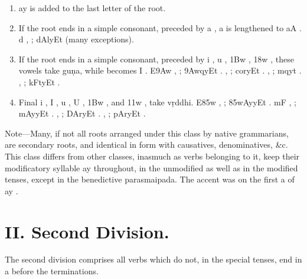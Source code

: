 \begin{enumerate}
  \begin{enumerate}
  \item {\dn ay}  is added to the last letter of the root.
  \item If the root ends in a simple consonant, preceded by {\dn a} ,
    {\dn a}  is lengthened to {\dn aA} . {\dn d} , ; {\dn dAlyEt}  (many exceptions).
  \item If the root ends in a simple consonant, preceded by {\dn i} ,
    {\dn u} , {\dn \31Bw} , {\dn \318w} , these vowels take guṇa, while
     becomes {\dn I} . {\dn E\39Aw} , ; {\dn \39Aw\?qyEt} . {\dn {}} , ; {\dn coryEt} . {\dn {}} , ; {\dn mq\0yt\?} . {\dn {}} ,
    ; {\dn kFt\0yEt} .
  \item Final {\dn i} , {\dn I} , {\dn u} , {\dn U} , {\dn \31Bw}
    , and {\dn \311w} , take vṛddhi. {\dn E\385w} ,
    ; {\dn \385wAyyEt} . {\dn mF} ,
    ; {\dn mAyyEt} . {\dn {}} , ; {\dn DAryEt} . {\dn {}} ,
    ; {\dn pAryEt} .
  \end{enumerate}

  \begin{note}
    Note—Many, if not all roots arranged under this class by native
    grammarians, are secondary roots, and identical in form with
    causatives, denominatives, \&c. This class differs from other
    classes, inasmuch as verbs belonging to it, keep their modificatory
    syllable {\dn ay}  throughout, in the unmodified as well as in
    the modified tenses, except in the benedictive parasmaipada. The
    accent was on the first {\dn a}  of {\dn ay} .
  \end{note}
\end{enumerate}

\section{II. Second Division.}

\s The second division comprises all verbs which do not, in the special
tenses, end in {\dn a}  before the terminations.


